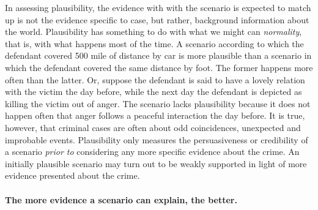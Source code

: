 \documentclass[10pt]{article}
\begin{document}
In assessing plausibility, the evidence with with the scenario is expected to match 
 up is not the evidence specific to case, but rather, background information about the world. 
Plausibility has something to do with what we might can \textit{normality}, that is, with
what happens most of the time. A scenario according to which the defendant covered 500 mile of distance by car is more plausible than a scenario in which the
defendant covered the same distance by foot. The former happens more often than the latter. 
Or, suppose the defendant is said to have a lovely relation with 
the victim the day before, while the next day the defendant is depicted as killing the victim out of anger.
The scenario lacks plausibility because it does not happen often that anger follows a peaceful 
interaction the day before. It is true, however, that criminal cases are often about odd coincidences, 
unexpected and improbable events.  Plausibility only measures the persuasiveness or credibility 
of a scenario \textit{prior to} considering any more specific evidence about the crime.  An initially plausible scenario may turn 
out to be weakly supported in light of more evidence presented about the crime. 



 
 


\paragraph{The more evidence a scenario can explain, the better.}
\end{document}

